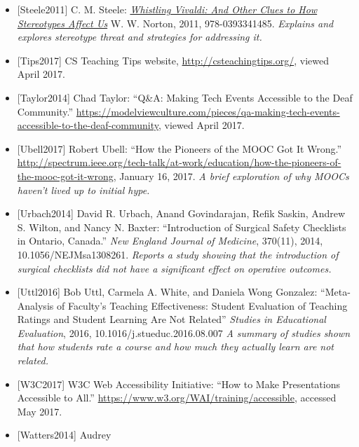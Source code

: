 \documentclass[10pt,statementpaper]{memoir}
\begin{document}
\begin{itemize}
\item
  \protect\hypertarget{steele-vivaldi}{}{{[}Steele2011{]}} C. M. Steele:
  \emph{\href{https://www.amazon.com/Whistling-Vivaldi-Stereotypes-Affect-Issues/dp/0393339726/}{Whistling
  Vivaldi: And Other Clues to How Stereotypes Affect Us}} W. W. Norton,
  2011, 978-0393341485. \emph{Explains and explores stereotype threat
  and strategies for addressing it.}
\item
  \protect\hypertarget{cs-teaching-tips}{}{{[}Tips2017{]}} CS Teaching
  Tips website, \url{http://csteachingtips.org/}, viewed April 2017.
\item
  \protect\hypertarget{taylor-interview}{}{{[}Taylor2014{]}} Chad
  Taylor: ``Q\&A: Making Tech Events Accessible to the Deaf Community.''
  \url{https://modelviewculture.com/pieces/qa-making-tech-events-accessible-to-the-deaf-community},
  viewed April 2017.
\item
  \protect\hypertarget{ubell-moocs}{}{{[}Ubell2017{]}} Robert Ubell:
  ``How the Pioneers of the MOOC Got It Wrong.''
  \url{http://spectrum.ieee.org/tech-talk/at-work/education/how-the-pioneers-of-the-mooc-got-it-wrong},
  January 16, 2017. \emph{A brief exploration of why MOOCs haven't lived
  up to initial hype.}
\item
  \protect\hypertarget{urbach-checklists}{}{{[}Urbach2014{]}} David R.
  Urbach, Anand Govindarajan, Refik Saskin, Andrew S. Wilton, and Nancy
  N. Baxter: ``Introduction of Surgical Safety Checklists in Ontario,
  Canada.'' \emph{New England Journal of Medicine}, 370(11), 2014,
  10.1056/NEJMsa1308261. \emph{Reports a study showing that the
  introduction of surgical checklists did not have a significant effect
  on operative outcomes.}
\item
  \protect\hypertarget{uttl-evaluations}{}{{[}Uttl2016{]}} Bob Uttl,
  Carmela A. White, and Daniela Wong Gonzalez: ``Meta-Analysis of
  Faculty's Teaching Effectiveness: Student Evaluation of Teaching
  Ratings and Student Learning Are Not Related'' \emph{Studies in
  Educational Evaluation}, 2016, 10.1016/j.stueduc.2016.08.007 \emph{A
  summary of studies shown that how students rate a course and how much
  they actually learn are not related.}
\item
  \protect\hypertarget{w3c-accessibility}{}{{[}W3C2017{]}} W3C Web
  Accessibility Initiative: ``How to Make Presentations Accessible to
  All.'' \url{https://www.w3.org/WAI/training/accessible}, accessed May
  2017.
\item
  \protect\hypertarget{watters-monsters}{}{{[}Watters2014{]}} {Audrey
}
\end{itemize}
\end{document}
